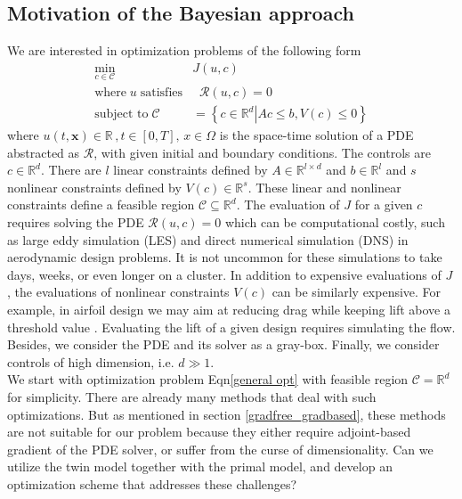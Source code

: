 \documentclass[a4paper,onecolumn]{article}
\theoremstyle{remark}
\begin{document}
\subsection{Motivation of the Bayesian approach}
We are interested in optimization problems of the following form
\begin{equation}\begin{split}
    \min_{c\in\mathcal{C}} & J(u,c)\\
    \textrm{where}\; u\; \textrm{satisfies}& \;\; \mathcal{R}(u,c) = 0\\
    \textrm{subject to} \; \mathcal{C} & = \left\{\left. c\in\mathbb{R}^d\right| 
    A c\le b, V(c)\le 0\right\}
\end{split}\label{general opt}
\end{equation}
where $u(t,\mathbf{x})\in\mathbb{R}\,, t\in[0,T], \,x\in\Omega$
is the space-time solution of a PDE abstracted as
$\mathcal{R}$, with given initial and boundary conditions.
The controls are $c\in\mathbb{R}^d$. 
There are $l$ linear constraints defined by $A\in\mathbb{R}^{l\times d}$ and $b\in\mathbb{R}^{l}$
and $s$ nonlinear constraints defined by $V(c)\in \mathbb{R}^s$. 
These linear and nonlinear constraints define a feasible region 
$\mathcal{C}\subseteq \mathbb{R}^d$. The evaluation of $J$ for a given $c$ requires
solving the PDE $\mathcal{R}(u,c)=0$ which can be computational costly, such
as large eddy simulation (LES) \cite{LES, LES oldest} 
and direct numerical simulation (DNS) \cite{DNS} in  
aerodynamic design problems. It is not uncommon for these simulations
to take days, weeks, or even longer on a cluster.
In addition to expensive evaluations of $J$, the evaluations of
nonlinear constraints $V(c)$ can be similarly expensive. For example, 
in airfoil design we may aim at reducing drag while keeping lift 
above a threshold value \cite{constraint lift}. Evaluating the lift of a given design
requires simulating the flow. Besides, we consider the PDE and its solver 
as a gray-box. Finally, we consider controls of high dimension, i.e. $d\gg 1$.\\

\noindent We start with optimization problem Eqn\eqref{general opt} with feasible region
$\mathcal{C}=\mathbb{R}^d$ for simplicity.
There are already many methods that deal with such optimizations. 
But as mentioned in section \ref{gradfree_gradbased}, these methods are not suitable
for our problem because they either require adjoint-based gradient of the PDE solver, 
or suffer from the curse of dimensionality. Can we utilize the twin model together
with the primal model, and develop an optimization scheme that addresses these challenges?\\
\end{document}
